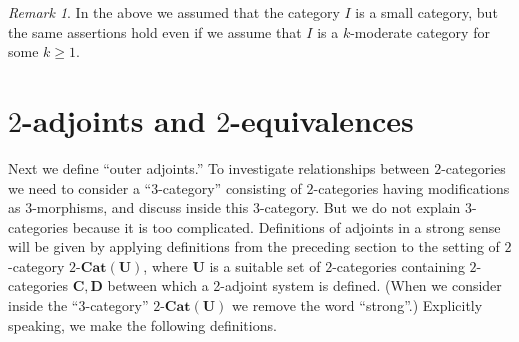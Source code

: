 \documentclass{surv-l}
\numberwithin{equation}{chapter}
\numberwithin{figure}{chapter}
\theoremstyle{plain}
\theoremstyle{definition}
\theoremstyle{remark}
\newtheorem{rmk}[thm]{Remark}
\begin{document}
\begin{rmk}\label{rmk:modr-conti}
In the above we assumed that the category $I$ is a small category,
but the same assertions hold even if we assume that $I$ is a $k$-moderate category
for some $k \ge 1$.
\end{rmk}

\section{$2$-adjoints and $2$-equivalences}Next we define ``outer adjoints.''
To investigate relationships between $2$-cate\-gories
we need to consider a ``3-category'' consisting of
$2$-categories having modifications as $3$-morphisms,
and discuss inside this $3$-category.
But we do not explain $3$-categories because it is too complicated.
Definitions of adjoints in a strong sense will be given by
applying definitions from the preceding section to the setting
of $2$-category $2\text{-}\mathbf{Cat}(\mathbf{U})$, where $\mathbf{U}$ is
a suitable set of $2$-categories containing $2$-categories
$\mathbf{C}, \mathbf{D}$ between which a 2-adjoint system is defined. %
(When we consider inside the ``$3$-category'' $2\text{-}\mathbf{Cat}(\mathbf{U})$
we remove the word ``strong''.)
Explicitly speaking, we make the following definitions.
\end{document}
